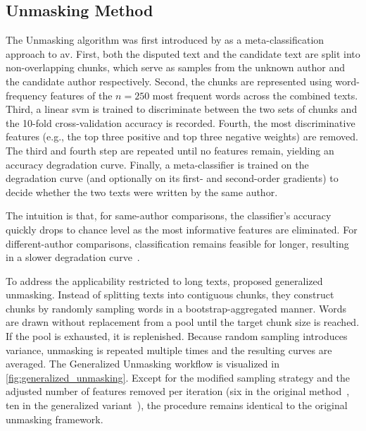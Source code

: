 \subsection{Unmasking Method}
\label{subsec:unmasking}

The Unmasking algorithm was first introduced by \citet{koppel_authorship_2004} as a meta-classification approach to \ac{av}. 
First, both the disputed text and the candidate text are split into non-overlapping chunks, which serve as samples from the unknown author and the candidate author respectively. 
Second, the chunks are represented using word-frequency features of the $n=250$ most frequent words across the combined texts.
Third, a linear \ac{svm} is trained to discriminate between the two sets of chunks and the 10-fold cross-validation accuracy is recorded.
Fourth, the most discriminative features (e.g., the top three positive and top three negative weights) are removed.  
The third and fourth step are repeated until no features remain, yielding an accuracy degradation curve.  
Finally, a meta-classifier is trained on the degradation curve (and optionally on its first- and second-order gradients) to decide whether the two texts were written by the same author.  

The intuition is that, for same-author comparisons, the classifier’s accuracy quickly drops to chance level as the most informative features are eliminated. 
For different-author comparisons, classification remains feasible for longer, resulting in a slower degradation curve~\citep{stein_intrinsic_2011,tyo_state_2022,bevendorff_divergence_based_2020,stamatatos_survey_2009}. 

To address the applicability restricted to long texts, \citet{bevendorff_generalizing_2019,bevendorff_divergence_based_2020} proposed generalized unmasking. 
Instead of splitting texts into contiguous chunks, they construct chunks by randomly sampling words in a bootstrap-aggregated manner. 
Words are drawn without replacement from a pool until the target chunk size is reached.
If the pool is exhausted, it is replenished. 
Because random sampling introduces variance, unmasking is repeated multiple times and the resulting curves are averaged. 
The Generalized Unmasking workflow is visualized in \autoref{fig:generalized_unmasking}. 
Except for the modified sampling strategy and the adjusted number of features removed per iteration (six in the original method~\citep{koppel_authorship_2004}, ten in the generalized variant~\citep{bevendorff_generalizing_2019}), the procedure remains identical to the original unmasking framework.

